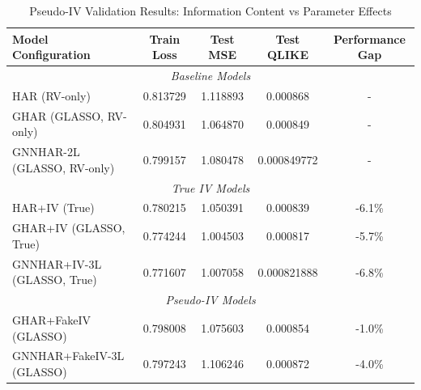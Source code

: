 \documentclass[12pt,a4paper]{article}
\begin{document}
\begin{table}[htbp]
\centering
\caption{Pseudo-IV Validation Results: Information Content vs Parameter Effects}
\label{tab:pseudo_iv_results}
\begin{tabular}{lcccc}
\toprule
Model Configuration & Train Loss & Test MSE & Test QLIKE & Performance Gap \\
\midrule
\multicolumn{5}{c}{\textit{Baseline Models}} \\
HAR (RV-only) & 0.813729 & 1.118893 & 0.000868 & - \\
GHAR (GLASSO, RV-only) & 0.804931 & 1.064870 & 0.000849 & - \\
GNNHAR-2L (GLASSO, RV-only) & 0.799157 & 1.080478 & 0.000849772 & - \\
\midrule
\multicolumn{5}{c}{\textit{True IV Models}} \\
HAR+IV (True) & 0.780215 & 1.050391 & 0.000839 & -6.1\% \\
GHAR+IV (GLASSO, True) & 0.774244 & 1.004503 & 0.000817 & -5.7\% \\
GNNHAR+IV-3L (GLASSO, True) & 0.771607 & 1.007058 & 0.000821888 & -6.8\% \\
\midrule
\multicolumn{5}{c}{\textit{Pseudo-IV Models}} \\
GHAR+FakeIV (GLASSO) & 0.798008 & 1.075603 & 0.000854 & -1.0\% \\
GNNHAR+FakeIV-3L (GLASSO) & 0.797243 & 1.106246 & 0.000872 & -4.0\% \\
\bottomrule
\end{tabular}
\end{table}
\end{document}
